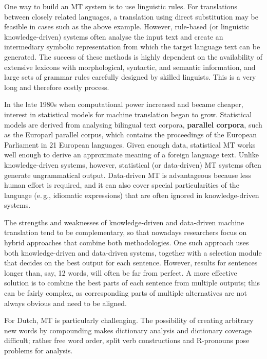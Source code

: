\documentclass[]{../../metanetpaper}
\begin{document}
\begin{multicols}{2}
One way to build an MT system is to use linguistic rules. For translations between closely related languages, a translation using direct substitution may be feasible in cases such as the above example. However, rule-based (or linguistic knowledge-driven) systems often analyse the input text and create an intermediary symbolic representation from which the target language text can be generated. The success of these methods is highly dependent on the availability of extensive lexicons with morphological, syntactic, and semantic information, and large sets of grammar rules carefully designed by skilled linguists. This is a very long and therefore costly process.

In the late 1980s when computational power increased and became cheaper, interest in statistical models for machine translation began to grow. Statistical models are derived from analysing bilingual text corpora, \textbf{parallel corpora}, such as the Europarl parallel corpus, which contains the proceedings of the European Parliament in 21 European languages. Given enough data, statistical MT works well enough to derive an approximate meaning of a foreign language text. Unlike knowledge-driven systems, however, statistical (or data-driven) MT systems often generate ungrammatical output. Data-driven MT is advantageous because less human effort is required, and it can also cover special particularities of the language (e.\,g., idiomatic expressions) that are often ignored in knowledge-driven systems.

The strengths and weaknesses of knowledge-driven and data-driven machine translation tend to be complementary, so that nowadays researchers focus on hybrid approaches that combine both methodologies. One such approach uses both knowledge-driven and data-driven systems, together with a selection module that decides on the best output for each sentence. However, results for sentences longer than, say, 12 words, will often be far from perfect. A more effective solution is to combine the best parts of each sentence from multiple outputs; this can be fairly complex, as corresponding parts of multiple alternatives are not always obvious and need to be aligned.


 For Dutch, MT is particularly challenging. The possibility of creating arbitrary new words by compounding makes dictionary analysis and dictionary coverage difficult; rather free word order, split verb constructions and R-pronouns pose problems for analysis.


\end{multicols}
\end{document}
